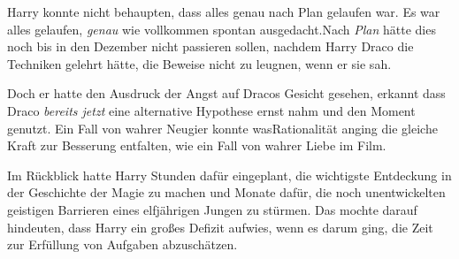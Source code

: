 Harry konnte nicht behaupten, dass alles genau nach Plan gelaufen war. Es war alles gelaufen, \emph{genau} wie vollkommen spontan ausgedacht.Nach \emph{Plan} hätte dies noch bis in den Dezember nicht passieren sollen, nachdem Harry Draco die Techniken gelehrt hätte, die Beweise nicht zu leugnen, wenn er sie sah.

Doch er hatte den Ausdruck der Angst auf Dracos Gesicht gesehen, erkannt dass Draco \emph{bereits jetzt} eine alternative Hypothese ernst nahm und den Moment genutzt. Ein Fall von wahrer Neugier konnte wasRationalität anging die gleiche Kraft zur Besserung entfalten, wie ein Fall von wahrer Liebe im Film.

Im Rückblick hatte Harry Stunden dafür eingeplant, die wichtigste Entdeckung in der Geschichte der Magie zu machen und Monate dafür, die noch unentwickelten geistigen Barrieren eines elfjährigen Jungen zu stürmen. Das mochte darauf hindeuten, dass Harry ein großes Defizit aufwies, wenn es darum ging, die Zeit zur Erfüllung von Aufgaben abzuschätzen.

